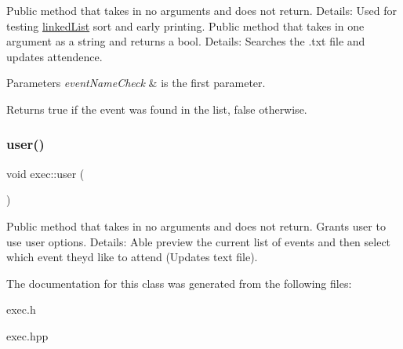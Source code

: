 Public method that takes in no arguments and does not return. Details\+: Used for testing \hyperlink{classlinked_list}{linked\+List} sort and early printing. Public method that takes in one argument as a string and returns a bool. Details\+: Searches the .txt file and updates attendence. 
\begin{DoxyParams}{Parameters}
{\em event\+Name\+Check} & is the first parameter. \\
\hline
\end{DoxyParams}
\begin{DoxyReturn}{Returns}
true if the event was found in the list, false otherwise. 
\end{DoxyReturn}
\mbox{\label{classexec_a924407f4d277807e949aa9e97470f536}} 
\subsubsection{\texorpdfstring{user()}{user()}}
{\footnotesize\ttfamily void exec\+::user (\begin{DoxyParamCaption}{ }\end{DoxyParamCaption})}

Public method that takes in no arguments and does not return. Grants user to use user options. Details\+: Able preview the current list of events and then select which event they\textquotesingle{}d like to attend (Updates text file). 

The documentation for this class was generated from the following files\+:\begin{DoxyCompactItemize}
\item 
exec.\+h\item 
exec.\+hpp\end{DoxyCompactItemize}
